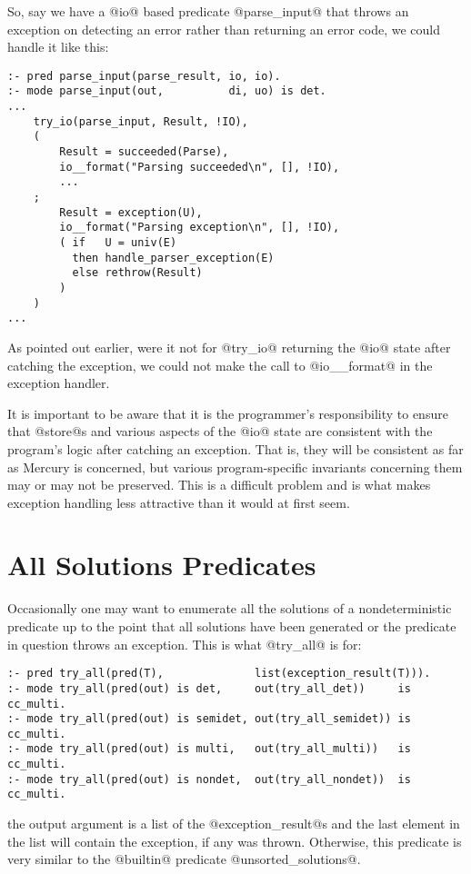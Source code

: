 So, say we have a @io@ based predicate @parse_input@ that throws
an exception on detecting an error rather than returning an error
code, we could handle it like this:
\begin{verbatim}
:- pred parse_input(parse_result, io, io).
:- mode parse_input(out,          di, uo) is det.
...
    try_io(parse_input, Result, !IO),
    (
        Result = succeeded(Parse),
        io__format("Parsing succeeded\n", [], !IO),
        ...
    ;
        Result = exception(U),
        io__format("Parsing exception\n", [], !IO),
        ( if   U = univ(E)
          then handle_parser_exception(E)
          else rethrow(Result)
        )
    )
...
\end{verbatim}
As pointed out earlier, were it not for @try_io@ returning the @io@
state after catching the exception, we could not make the call to
@io__format@ in the exception handler.

It is important to be aware that it is the programmer's
responsibility to ensure that @store@s and various aspects of the
@io@ state are consistent with the program's logic after catching
an exception.  That is, they will be consistent as far as Mercury
is concerned, but various program-specific invariants concerning
them may or may not be preserved.  This is a difficult problem
and is what makes exception handling less attractive than it would
at first seem.

\section{All Solutions Predicates}

Occasionally one may want to enumerate all the solutions of a
nondeterministic predicate up to the point that all solutions
have been generated or the predicate in question throws an
exception.  This is what @try_all@ is for:
\begin{verbatim}
:- pred try_all(pred(T),              list(exception_result(T))).
:- mode try_all(pred(out) is det,     out(try_all_det))     is cc_multi.
:- mode try_all(pred(out) is semidet, out(try_all_semidet)) is cc_multi.
:- mode try_all(pred(out) is multi,   out(try_all_multi))   is cc_multi.
:- mode try_all(pred(out) is nondet,  out(try_all_nondet))  is cc_multi.
\end{verbatim}
the output argument is a list of the @exception_result@s and the last
element in the list will contain the exception, if any was thrown.
Otherwise, this predicate is very similar to the @builtin@
predicate @unsorted_solutions@.


